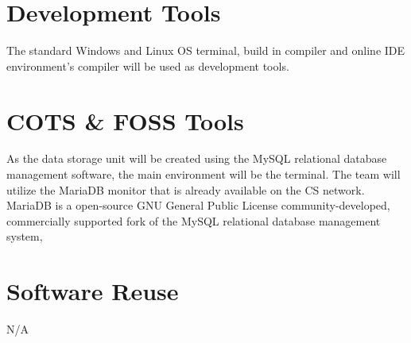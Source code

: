 \documentclass[letterpaper,12pt,oneside,listof=totoc]{scrreprt}
\begin{document}
\section{Development Tools}
The standard Windows and Linux OS terminal, build in compiler and online IDE environment's compiler will be used as development tools.

\section{COTS \& FOSS Tools}
As the data storage unit will be created using the MySQL relational database management software, the main environment will be the terminal. The team will utilize the MariaDB monitor that is already available on the CS network.
MariaDB is a open-source GNU General Public License community-developed, commercially supported fork of the MySQL relational database management system, 

\section{Software Reuse}
N/A
\end{document}
